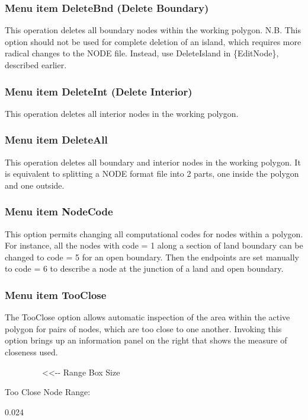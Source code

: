\documentclass{article}
\begin{document}
\subsubsection[Menu item DeleteBnd (Delete Boundary)]{Menu item DeleteBnd (Delete Boundary)}
This operation deletes all boundary nodes within the working polygon. N.B. This option should not be used for complete deletion of an island, which requires more radical changes to the NODE file. Instead, use DeleteIsland in \{EditNode\}, described earlier.

\subsubsection[Menu item DeleteInt (Delete Interior)]{Menu item DeleteInt (Delete Interior)}
This operation deletes all interior nodes in the working polygon.

\subsubsection[Menu item DeleteAll]{Menu item DeleteAll}
This operation deletes all boundary and interior nodes in the working polygon. It is equivalent to splitting a NODE format file into 2 parts, one inside the polygon and one outside.

\subsubsection[Menu item NodeCode]{Menu item NodeCode}
This option permits changing all computational codes for nodes within a polygon. For instance, all the nodes with code = 1 along a section of land boundary can be changed to code = 5 for an open boundary. Then the endpoints are set manually to code = 6 to describe a node at the junction of a land and open boundary.

\subsubsection[Menu item TooClose]{Menu item TooClose}
The TooClose option allows automatic inspection of the area within the active polygon for pairs of nodes, which are too close to one another. Invoking this option brings up an information panel on the right that shows the measure of closeness used. 

\ \ \ \ \ \ \ \ \ {\textless}{\textless}-{}- Range Box Size

Too Close Node Range:

0.024
\end{document}
